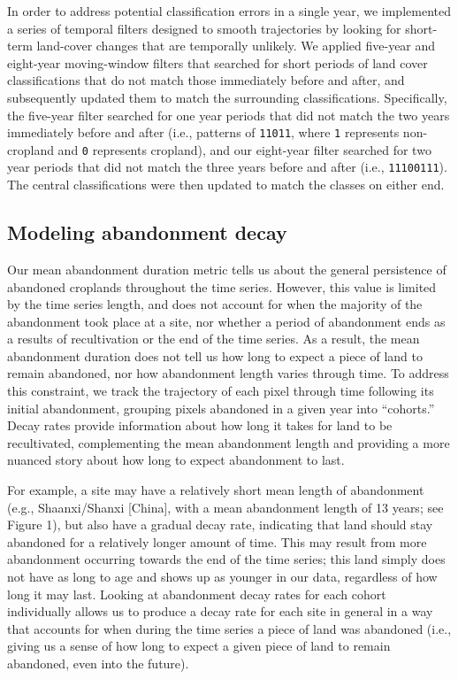 \documentclass[
]{article}
\begin{document}
In order to address potential classification errors in a single year, we implemented a series of temporal filters designed to smooth trajectories by looking for short-term land-cover changes that are temporally unlikely.
We applied five-year and eight-year moving-window filters that searched for short periods of land cover classifications that do not match those immediately before and after, and subsequently updated them to match the surrounding classifications.
Specifically, the five-year filter searched for one year periods that did not match the two years immediately before and after (i.e., patterns of \texttt{11011}, where \texttt{1} represents non-cropland and \texttt{0} represents cropland), and our eight-year filter searched for two year periods that did not match the three years before and after (i.e., \texttt{11100111}).
The central classifications were then updated to match the classes on either end.

\hypertarget{decay-models-si}{%
\subsection{Modeling abandonment decay}\label{decay-models-si}}

Our mean abandonment duration metric tells us about the general persistence of abandoned croplands throughout the time series.
However, this value is limited by the time series length, and does not account for when the majority of the abandonment took place at a site, nor whether a period of abandonment ends as a results of recultivation or the end of the time series.
As a result, the mean abandonment duration does not tell us how long to expect a piece of land to remain abandoned, nor how abandonment length varies through time.
To address this constraint, we track the trajectory of each pixel through time following its initial abandonment, grouping pixels abandoned in a given year into ``cohorts.'' Decay rates provide information about how long it takes for land to be recultivated, complementing the mean abandonment length and providing a more nuanced story about how long to expect abandonment to last.

For example, a site may have a relatively short mean length of abandonment (e.g., Shaanxi/Shanxi {[}China{]}, with a mean abandonment length of 13 years; see Figure 1), but also have a gradual decay rate, indicating that land should stay abandoned for a relatively longer amount of time.
This may result from more abandonment occurring towards the end of the time series; this land simply does not have as long to age and shows up as younger in our data, regardless of how long it may last.
Looking at abandonment decay rates for each cohort individually allows us to produce a decay rate for each site in general in a way that accounts for when during the time series a piece of land was abandoned (i.e., giving us a sense of how long to expect a given piece of land to remain abandoned, even into the future).
\end{document}
